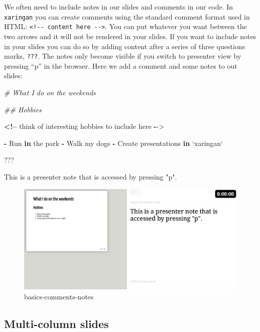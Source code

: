 \documentclass[
]{book}
\newenvironment{Shaded}{\begin{snugshade}}{\end{snugshade}}
\newcommand{\CommentTok}[1]{\textcolor[rgb]{0.37,0.37,0.37}{\textit{#1}}}
\newcommand{\ControlFlowTok}[1]{\textcolor[rgb]{0.27,0.27,0.27}{\textbf{#1}}}
\newcommand{\DataTypeTok}[1]{\textcolor[rgb]{0.27,0.27,0.27}{#1}}
\newcommand{\NormalTok}[1]{#1}
\newcommand{\OperatorTok}[1]{\textcolor[rgb]{0.43,0.43,0.43}{\textbf{#1}}}
\newcommand{\StringTok}[1]{\textcolor[rgb]{0.5,0.5,0.5}{#1}}
\begin{document}
We often need to include notes in our slides and comments in our code. In \texttt{xaringan} you can create comments using the standard comment format used in HTML: \texttt{\textless{}!-\/-\ content\ here\ -\/-\textgreater{}}. You can put whatever you want between the two arrows and it will not be rendered in your slides. If you want to include notes in your slides you can do so by adding content after a series of three questions marks, \texttt{???}. The notes only become visible if you switch to presenter view by pressing ``p'' in the browser. Here we add a comment and some notes to out slides:

\begin{Shaded}
\begin{Highlighting}[]
\CommentTok{# What I do on the weekends}

\CommentTok{## Hobbies}

\OperatorTok{<!--}\StringTok{ }\NormalTok{think of interesting hobbies to include here }\OperatorTok{-}\NormalTok{->}

\OperatorTok{-}\StringTok{ }\NormalTok{Run }\ControlFlowTok{in}\NormalTok{ the park }
\OperatorTok{-}\StringTok{ }\NormalTok{Walk my dogs }
\OperatorTok{-}\StringTok{ }\NormalTok{Create presentations }\ControlFlowTok{in} \StringTok{`}\DataTypeTok{xaringan}\StringTok{`}

\NormalTok{???}

\NormalTok{This is a presenter note that is accessed by pressing }\StringTok{"p"}\NormalTok{.}
\end{Highlighting}
\end{Shaded}

\begin{figure}
\centering
\includegraphics{img/02_basics-comments-notes.png}
\caption{basics-comments-notes}
\end{figure}

\hypertarget{multi-column-slides}{%
\subsection{Multi-column slides}\label{multi-column-slides}}
\end{document}
